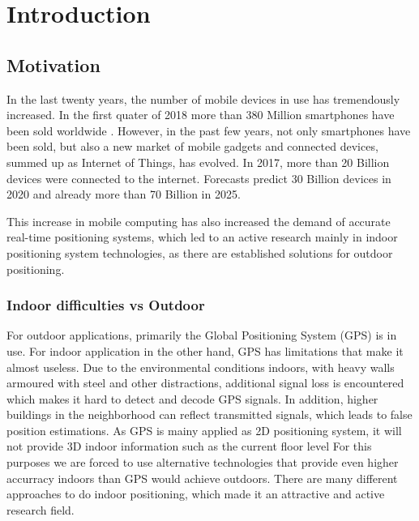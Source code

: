 
\chapter{Introduction} %

\label{Chapter1} %


\section{Motivation}
In the last twenty years, the number of mobile devices in use has tremendously increased. In the first quater of 2018 more than 380 Million smartphones have been sold worldwide \cite{Gartner}. However, in the past few years, not only smartphones have been sold, but also a new market of mobile gadgets and connected devices, summed up as Internet of Things, has evolved. In 2017, more than 20 Billion devices were connected to the internet. Forecasts predict 30 Billion devices in 2020 and already more than 70 Billion in 2025. \cite{Statista}

This increase in mobile computing has also increased the demand of accurate real-time positioning systems, which led to an active research mainly in indoor positioning system technologies, as there are established solutions for outdoor positioning. 

\subsection{Indoor difficulties vs Outdoor}

For outdoor applications, primarily the Global Positioning System (GPS) is in use. For indoor application in the other hand, GPS has limitations that make it almost useless. Due to the environmental conditions indoors, with heavy walls armoured with steel and other distractions, additional signal loss is encountered which makes it hard to detect and decode GPS signals. \cite{GPSforIndoor} In addition, higher buildings in the neighborhood can reflect transmitted signals, which leads to false position estimations. As GPS is mainy applied as 2D positioning system, it will not provide 3D indoor information such as the current floor level
For this purposes we are forced to use alternative technologies that provide even higher accurracy indoors than GPS would achieve outdoors. There are many different approaches to do indoor positioning, which made it an attractive and active research field. 


